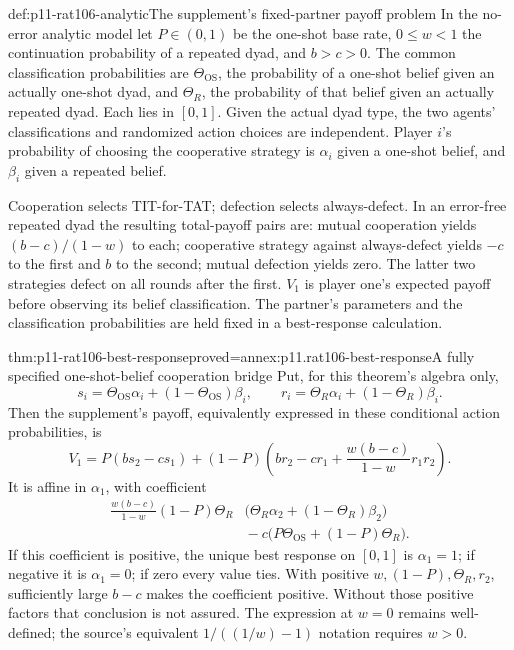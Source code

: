 \begin{hbdefinition}{def:p11-rat106-analytic}{The supplement's fixed-partner payoff problem}
In the no-error analytic model let \(P\in(0,1)\) be the one-shot
base rate, \(0\leq w<1\) the continuation probability of a repeated
dyad, and \(b>c>0\). The common classification probabilities are
\(\Theta_{\mathrm{OS}}\), the probability of a one-shot belief given
an actually one-shot dyad, and \(\Theta_R\), the probability of that
belief given an actually repeated dyad. Each lies in \([0,1]\).
Given the actual dyad type, the two agents' classifications and
randomized action choices are independent. Player \(i\)'s probability
of choosing the cooperative strategy is \(\alpha_i\) given a
one-shot belief, and \(\beta_i\) given a repeated belief.

Cooperation selects TIT-for-TAT; defection selects always-defect.
In an error-free repeated dyad the resulting total-payoff pairs are:
mutual cooperation yields \((b-c)/(1-w)\) to each; cooperative
strategy against always-defect yields \(-c\) to the first and
\(b\) to the second; mutual defection yields zero. The latter two
strategies defect on all rounds after the first. \(V_1\) is player
one's expected payoff before observing its belief classification.
The partner's parameters and the classification probabilities are
held fixed in a best-response calculation.
\end{hbdefinition}

\begin{hbtheorem}{thm:p11-rat106-best-response}{proved=annex:p11.rat106-best-response}{A fully specified one-shot-belief cooperation bridge}
Put, for this theorem's algebra only,
\[
 s_i=\Theta_{\mathrm{OS}}\alpha_i+(1-\Theta_{\mathrm{OS}})\beta_i,
 \qquad r_i=\Theta_R\alpha_i+(1-\Theta_R)\beta_i.
\]
Then the supplement's payoff, equivalently expressed in these conditional
action probabilities, is
\[
 V_1=P(bs_2-cs_1)+(1-P)
       \left(br_2-cr_1+\frac{w(b-c)}{1-w}r_1r_2\right).
\]
It is affine in \(\alpha_1\), with coefficient
\[
 \begin{aligned}
 \frac{w(b-c)}{1-w}(1-P)\Theta_R
       &\bigl(\Theta_R\alpha_2+(1-\Theta_R)\beta_2\bigr)\\
       &{}-c\bigl(P\Theta_{\mathrm{OS}}+(1-P)\Theta_R\bigr).
 \end{aligned}
\]
If this coefficient is positive, the unique best response on
\([0,1]\) is \(\alpha_1=1\); if negative it is
\(\alpha_1=0\); if zero every value ties. With positive
\(w,(1-P),\Theta_R,r_2\), sufficiently large \(b-c\)
makes the coefficient positive. Without those positive factors that
conclusion is not assured. The expression at \(w=0\) remains
well-defined; the source's equivalent \(1/((1/w)-1)\) notation
requires \(w>0\).
\end{hbtheorem}

